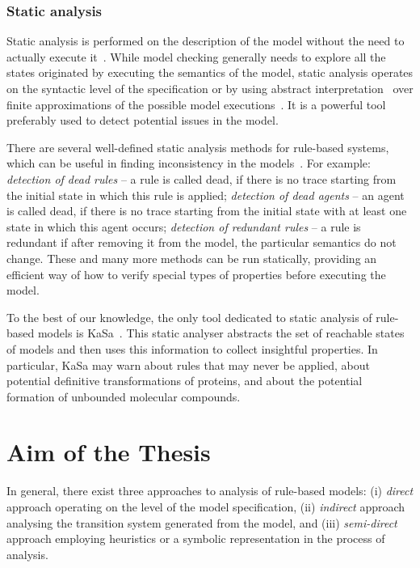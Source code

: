 \documentclass[11pt,a4paper]{report}
\begin{document}
\subsection{Static analysis}\label{static_analysis}

Static analysis is performed on the description of the model without the need to actually execute it~\cite{nielson2015principles}. While model checking generally needs to explore all the states originated by executing the semantics of the model, static analysis operates on the syntactic level of the specification or by using abstract interpretation~\cite{cousot1977abstract} over finite approximations of the possible model executions~\cite{pauleve2012static}. It is a powerful tool preferably used to detect potential issues in the model.

There are several well-defined static analysis methods for rule-based systems, which can be useful in finding inconsistency in the models~\cite{danos2009rule}. For example: \emph{detection of dead rules} -- a rule is called dead, if there is no trace starting from the initial state in which this rule is applied; \emph{detection of dead agents} -- an agent is called dead, if there is no trace starting from the initial state with at least one state in which this agent occurs; \emph{detection of redundant rules} -- a rule is redundant if after removing it from the model, the particular semantics do not change. These and many more methods can be run statically, providing an efficient way of how to verify special types of properties before executing the model.

To the best of our knowledge, the only tool dedicated to static analysis of rule-based models is KaSa~\cite{boutillier2018kasa}. This static analyser abstracts the set of reachable states of models and then uses this information to collect insightful properties. In particular, KaSa may warn about rules that may never be applied, about potential definitive transformations of proteins, and about the potential formation of unbounded molecular compounds.

\chapter{Aim of the Thesis} \label{chap:aim}

In general, there exist three approaches to analysis of rule-based models: (i) \emph{direct} approach operating on the level of the model specification, (ii) \emph{indirect} approach analysing the transition system generated from the model, and (iii) \emph{semi-direct} approach employing heuristics or a symbolic representation in the process of analysis.
\end{document}
